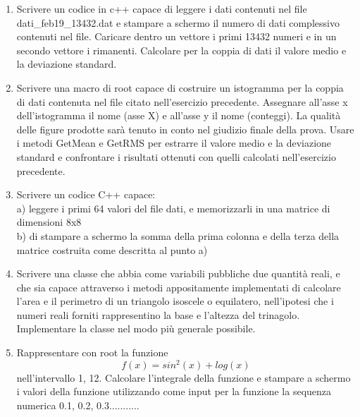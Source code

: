 \documentclass[11pt,fleqn]{book} %
\begin{document}
\begin{enumerate}
\item Scrivere un codice in c++ capace di  leggere i dati contenuti nel file dati\_feb19\_13432.dat  e stampare a schermo il numero di dati complessivo contenuti nel file. Caricare dentro un vettore i primi 13432 numeri e in un secondo vettore i rimanenti. Calcolare per la coppia di dati il valore medio e la deviazione standard.

\item Scrivere una macro di root capace di costruire un istogramma per la coppia di dati contenuta nel file citato nell'esercizio precedente. Assegnare all'asse x dell'istogramma il nome (asse X) e all'asse y il nome (conteggi). La qualità delle figure prodotte sarà tenuto in conto nel giudizio finale della prova.
Usare i metodi GetMean e GetRMS per estrarre il valore medio e la deviazione standard e confrontare i risultati ottenuti con quelli calcolati nell'esercizio precedente.
 

\item Scrivere un codice C++ capace:\\
     a) leggere i primi 64 valori del file dati, e memorizzarli in una matrice di dimensioni 8x8 \\
     b) di stampare a schermo la somma della prima colonna e della terza della matrice costruita come descritta al punto a)\\
     

\item Scrivere una classe che abbia come variabili pubbliche due quantità reali, e che sia capace attraverso i metodi appositamente implementati di calcolare l'area e il perimetro di un triangolo isoscele o equilatero, nell'ipotesi che i numeri reali forniti rappresentino la base e l'altezza del trinagolo. Implementare la classe nel modo più generale possibile.

\item Rappresentare con root la funzione 
$$f(x)=sin^2(x)+log(x)$$
nell'intervallo 1, 12. Calcolare l'integrale della funzione e stampare a schermo i valori della funzione utilizzando come input per la funzione la sequenza numerica 0.1, 0.2, 0.3...........

\end{enumerate}
\end{document}
